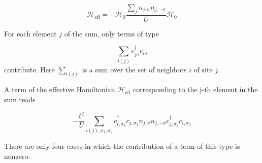 \begin{equation}
\mathcal{H}_{\text{eff}} = - \mathcal{H}_0 \frac{\sum_j n_{j,\sigma} n_{j, -\sigma}}{U} \mathcal{H}_0
\end{equation}

For each element $j$ of the sum, only terms of type 

\begin{equation*}
\sum_{i(j)} c_{j\sigma}^\dagger c_{i\sigma} 
\end{equation*}
contribute.
Here $\sum_{i(j)}$ is a sum over the set of neighbors $i$ of site $j$.

A term of the effective Hamiltonian $\mathcal{H}_{\text{eff}}$ corresponding to the j-th element in the sum reads

\begin{equation*}
-\frac{t^2}{U} \sum_{i(j), \sigma_1, \sigma_2 } c_{i,\sigma_1}^\dagger c_{j,\sigma_1} n_{j,\sigma} n_{j, -\sigma} c_{j, \sigma_2}^\dagger c_{i, \sigma_2}
\end{equation*}

There are only four cases in which the contribution of a term of this type is nonzero.


